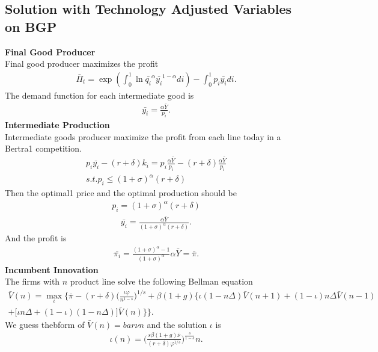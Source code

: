 \documentclass[a4paper,12pt]{article}
\begin{document}
\subsection*{Solution with Technology Adjusted Variables on BGP}
\textbf{Final Good Producer}\\
Final good producer maximizes the profit
\begin{align}
    \bar{\Pi}_t = \exp (\int_0^1 \ln \bar{q_i}^\alpha \bar{y_i}^{1-\alpha} di) -\int_0^1 p_i \bar{y_i} di.
\end{align}
The demand function for each intermediate good is 
\begin{align}
    \bar{y_i} = \frac{\alpha\bar{Y}}{p_i}.
\end{align}
\textbf{Intermediate Production}\\
Intermediate goods producer maximize the profit from each line today in a Bertra1 competition.
\begin{align}
    p_i \bar{y_i} -(r+\delta)k_i = p_i \frac{\alpha\bar{Y}}{p_i} - (r+\delta)\frac{\alpha\bar{Y}}{p_i}\\
    s.t. p_i \leq (1+\sigma)^\alpha(r+\delta)
\end{align}
Then the optimal1 price and the optimal production should be
\begin{align}
    p_i = (1+\sigma)^\alpha(r+\delta)
\end{align}
\begin{align}
    \bar{y_i} = \frac{\alpha\bar{Y}}{(1+\sigma)^\alpha(r+\delta)}.
\end{align}
And the profit is
\begin{align}
    \bar{\pi_i} = \frac{(1+\sigma)^\alpha -1}{(1+\sigma)^\alpha}\alpha\bar{Y} = \bar{\pi}.
\end{align}
\textbf{Incumbent Innovation}\\
The firms with $n$ product line solve the following Bellman equation
\begin{align}
    \bar{V}(n) = \max_{\iota}\bigg\{\bar{\pi} - (r+\delta)\big(\frac{\iota\varphi}{n^{1-s}}\big)^{1/s} + \beta (1+g)\Big\{\iota (1-n\Delta)\bar{V}(n+1) + (1-\iota)n\Delta \bar{V}(n-1) \\ 
    + \big[\iota n\Delta+(1-\iota)(1-n\Delta)\big]\bar{V}(n) \Big\}
    \bigg\}.
\end{align}
We guess thebform of $\bar{V}(n) =bar{\nu} n $ and the solution $\iota$ is
\begin{align}
    \iota(n) = \Big(\frac{s\beta (1+g)\bar\nu}{(r+\delta)\varphi^{1/s}}\Big)^\frac{s}{1-s}n.
\end{align}
\end{document}
